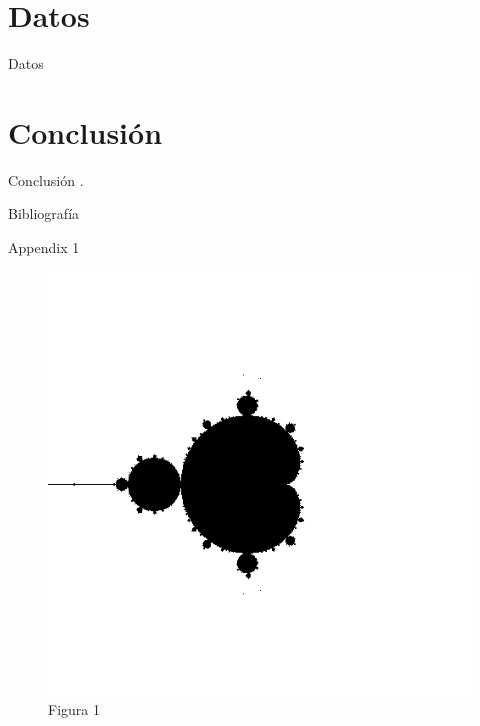 \documentclass[11pt, aspectratio = 169]{beamer}
\begin{document}
    \section{Datos}
        \begin{frame}{Datos}
            \lipsum[1]
        \end{frame}
    \section{Conclusión}
        \begin{frame}{Conclusión}
            \lipsum[1]. 
        \end{frame}
    \begin{frame}{Bibliografía}
        
        
            \nocite{cameron-2010}
    \end{frame}
    \begin{frame}
        \maketitle
    \end{frame}
    \begin{frame}{Appendix 1}
        \begin{figure}[H]
            \centering
            \caption{Figura 1}
            \includegraphics[scale = 0.3]{figura1.png}
        \end{figure}
    \end{frame}
\end{document}

